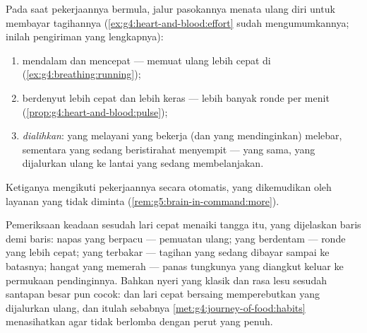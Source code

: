 \begin{proposition}\label{prop:g7:organs-at-work:supply}
Pada saat pekerjaannya bermula, jalur pasokannya menata ulang diri
untuk membayar tagihannya (\cref{ex:g4:heart-and-blood:effort} sudah
mengumumkannya; inilah pengiriman yang lengkapnya):
\begin{enumerate}
  \item \emph{} mendalam dan mencepat --- memuat ulang
         lebih cepat di 
        (\cref{ex:g4:breathing:running});
  \item \emph{} berdenyut lebih cepat dan lebih keras --- lebih
        banyak ronde per menit
        (\cref{prop:g4:heart-and-blood:pulse});
  \item {} \emph{dialihkan}:  yang melayani  yang
        bekerja (dan  yang mendinginkan) melebar, sementara
          yang sedang beristirahat
        menyempit ---  yang sama, yang dijalurkan ulang ke lantai
        yang sedang membelanjakan.
\end{enumerate}
Ketiganya mengikuti pekerjaannya secara otomatis, yang dikemudikan
oleh layanan  yang tidak diminta
(\cref{rem:g5:brain-in-command:more}).
\end{proposition}
\admitted

\begin{example}\label{ex:g7:organs-at-work:felt}
Pemeriksaan keadaan sesudah lari cepat menaiki tangga itu, yang
dijelaskan baris demi baris: napas yang berpacu --- pemuatan ulang;
 yang berdentam --- ronde yang lebih cepat;  yang
terbakar --- tagihan  yang sedang dibayar sampai ke batasnya;
 hangat yang memerah --- panas tungkunya yang diangkut keluar ke
permukaan pendinginnya. Bahkan nyeri  yang klasik dan rasa
lesu sesudah santapan besar pun cocok:  dan lari cepat
bersaing memperebutkan  yang dijalurkan ulang, dan itulah
sebabnya \cref{met:g4:journey-of-food:habits} menasihatkan agar tidak
berlomba dengan perut yang penuh.
\end{example}

